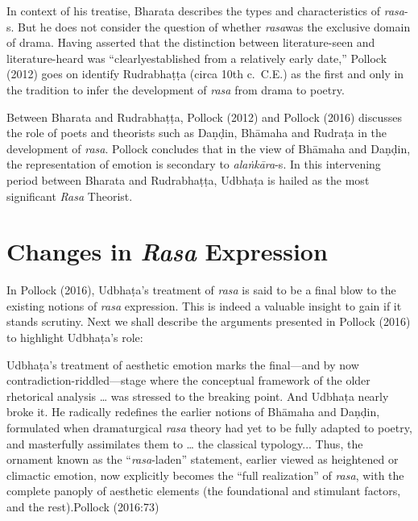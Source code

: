 In context of his treatise, Bharata describes the types and characteristics of \textsl{rasa}-s. But he does not consider the question of whether \textsl{rasa}\break was the exclusive domain of drama. Having asserted that the distinction between literature-seen and literature-heard was “clearly\break established from a relatively early date,” Pollock (2012) goes on identify Rudrabhaṭṭa (circa 10th c.\ C.E.) as the first and only in the tradition to infer the development of \textsl{rasa} from drama to poetry. 


Between Bharata and Rudrabhaṭṭa, Pollock (2012) and Pollock (2016) discusses the role of poets and theorists such as Daṇḍin, Bhāmaha and Rudraṭa in the development of \textsl{rasa}. Pollock concludes that in the view of Bhāmaha and Daṇḍin, the representation of emotion is secondary to \textsl{alaṅkāra}-s. In this intervening period between Bharata and Rudrabhaṭṭa, Udbhaṭa is hailed as the most significant \textsl{Rasa} Theorist. 

\section*{Changes in \textsl{Rasa} Expression}

In Pollock (2016), Udbhaṭa’s treatment of \textsl{rasa} is said to be a final blow to the existing notions of \textsl{rasa} expression. This is indeed a valuable insight to gain if it stands scrutiny. Next we shall describe the arguments presented in Pollock (2016) to highlight Udbhaṭa’s role: 

\begin{myquote}
Udbhaṭa’s treatment of aesthetic emotion marks the final—and by now contradiction-riddled—stage where the conceptual framework of the older rhetorical analysis … was stressed to the breaking point. And Udbhaṭa nearly broke it. He radically redefines the earlier notions of Bhāmaha and Daṇḍin, formulated when dramaturgical \textsl{rasa} theory had yet to be fully adapted to poetry, and masterfully assimilates them to … the classical typology... Thus, the ornament known as the “\textsl{rasa}-laden” statement, earlier viewed as heightened or climactic emotion, now explicitly becomes the “full realization” of \textsl{rasa}, with the complete panoply of aesthetic elements (the foundational and stimulant factors, and the rest).\hfill Pollock (2016:73)
\end{myquote}

